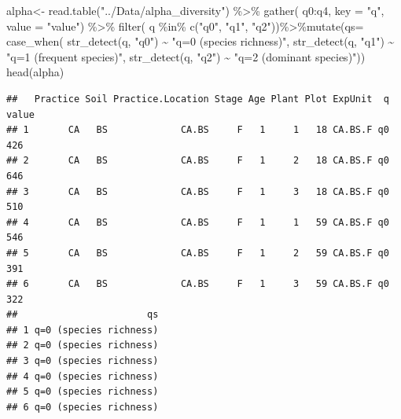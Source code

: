 \documentclass[]{interact}
\theoremstyle{plain}%
\theoremstyle{definition}
\theoremstyle{remark}
\newenvironment{Shaded}{\begin{snugshade}}{\end{snugshade}}
\newcommand{\AttributeTok}[1]{\textcolor[rgb]{0.77,0.63,0.00}{#1}}
\newcommand{\FunctionTok}[1]{\textcolor[rgb]{0.00,0.00,0.00}{#1}}
\newcommand{\NormalTok}[1]{#1}
\newcommand{\OtherTok}[1]{\textcolor[rgb]{0.56,0.35,0.01}{#1}}
\newcommand{\SpecialCharTok}[1]{\textcolor[rgb]{0.00,0.00,0.00}{#1}}
\newcommand{\StringTok}[1]{\textcolor[rgb]{0.31,0.60,0.02}{#1}}
\begin{document}
\begin{Shaded}
\begin{Highlighting}[]
\NormalTok{alpha}\OtherTok{\textless{}{-}} \FunctionTok{read.table}\NormalTok{(}\StringTok{"../Data/alpha\_diversity"}\NormalTok{) }\SpecialCharTok{\%\textgreater{}\%} \FunctionTok{gather}\NormalTok{(}
\NormalTok{  q0}\SpecialCharTok{:}\NormalTok{q4, }\AttributeTok{key =} \StringTok{"q"}\NormalTok{, }\AttributeTok{value =} \StringTok{"value"}\NormalTok{) }\SpecialCharTok{\%\textgreater{}\%} \FunctionTok{filter}\NormalTok{(}
\NormalTok{    q }\SpecialCharTok{\%in\%} \FunctionTok{c}\NormalTok{(}\StringTok{"q0"}\NormalTok{, }\StringTok{"q1"}\NormalTok{, }\StringTok{"q2"}\NormalTok{))}\SpecialCharTok{\%\textgreater{}\%}\FunctionTok{mutate}\NormalTok{(}\AttributeTok{qs=} \FunctionTok{case\_when}\NormalTok{(}
  \FunctionTok{str\_detect}\NormalTok{(q, }\StringTok{"q0"}\NormalTok{) }\SpecialCharTok{\textasciitilde{}} \StringTok{"q=0 (species richness)"}\NormalTok{,}
  \FunctionTok{str\_detect}\NormalTok{(q, }\StringTok{"q1"}\NormalTok{) }\SpecialCharTok{\textasciitilde{}} \StringTok{"q=1 (frequent species)"}\NormalTok{,}
  \FunctionTok{str\_detect}\NormalTok{(q, }\StringTok{"q2"}\NormalTok{) }\SpecialCharTok{\textasciitilde{}} \StringTok{"q=2 (dominant species)"}\NormalTok{))}
\FunctionTok{head}\NormalTok{(alpha)}
\end{Highlighting}
\end{Shaded}

\begin{verbatim}
##   Practice Soil Practice.Location Stage Age Plant Plot ExpUnit  q value
## 1       CA   BS             CA.BS     F   1     1   18 CA.BS.F q0   426
## 2       CA   BS             CA.BS     F   1     2   18 CA.BS.F q0   646
## 3       CA   BS             CA.BS     F   1     3   18 CA.BS.F q0   510
## 4       CA   BS             CA.BS     F   1     1   59 CA.BS.F q0   546
## 5       CA   BS             CA.BS     F   1     2   59 CA.BS.F q0   391
## 6       CA   BS             CA.BS     F   1     3   59 CA.BS.F q0   322
##                       qs
## 1 q=0 (species richness)
## 2 q=0 (species richness)
## 3 q=0 (species richness)
## 4 q=0 (species richness)
## 5 q=0 (species richness)
## 6 q=0 (species richness)
\end{verbatim}
\end{document}
